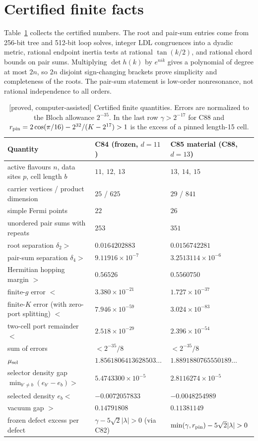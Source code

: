 \documentclass[11pt]{article}
\newcommand{\tg}[1]{\textsf{[#1]}}
\begin{document}
\section{Certified finite facts}\label{sec:facts}

Table~\ref{tab:cert} collects the certified numbers. The root and pair-sum entries come from 256-bit tree and 512-bit loop solves, integer LDL congruences into a dyadic metric, rational endpoint inertia tests at rational $\tan(k/2)$, and rational chord bounds on pair sums. Multiplying $\det h(k)$ by $e^{nik}$ gives a polynomial of degree at most $2n$, so $2n$ disjoint sign-changing brackets prove simplicity and completeness of the roots. The pair-sum statement is low-order nonresonance, not rational independence to all orders.

\begin{table}[h]
\centering
\footnotesize
\begin{tabular}{lll}
\toprule
Quantity & C84 (frozen, $d=11$) & C85 material (C88, $d=13$)\\
\midrule
active flavours $n$, data sites $p$, cell length $b$ & $11,\ 12,\ 13$ & $13,\ 14,\ 15$\\
carrier vertices / product dimension & $25$ / $625$ & $29$ / $841$\\
simple Fermi points & $22$ & $26$\\
unordered pair sums with repeats & $253$ & $351$\\
root separation $\delta_2>$ & $0.0164202883$ & $0.0156742281$\\
pair-sum separation $\delta_4>$ & $9.11916\times10^{-7}$ & $3.2513114\times10^{-6}$\\
Hermitian hopping margin $>$ & $0.56526$ & $0.5560750$\\
finite-$g$ error $<$ & $3.380\times10^{-21}$ & $1.727\times10^{-37}$\\
finite-$K$ error (with zero-port splitting) $<$ & $7.946\times10^{-59}$ & $3.024\times10^{-83}$\\
two-cell port remainder $<$ & $2.518\times10^{-29}$ & $2.396\times10^{-54}$\\
sum of errors & $<2^{-35}/8$ & $<2^{-35}/8$\\
$\mu_{\rm sel}$ & $1.8561806413628503\ldots$ & $1.8891880765550189\ldots$\\
selector density gap $\min_{b'\ne b}(e_{b'}-e_b)>$ & $5.4743300\times10^{-5}$ & $2.8116274\times10^{-5}$\\
selected density $e_b<$ & $-0.0072057833$ & $-0.0048254989$\\
vacuum gap $>$ & $0.14791808$ & $0.11381149$\\
frozen defect excess per defect & $\gamma-5\sqrt2|\lambda|>0$ (via C82) & $\min(\gamma,r_{\rm pin})-5\sqrt2|\lambda|>0$\\
\bottomrule
\end{tabular}
\caption{\tg{proved, computer-assisted} Certified finite quantities. Errors are normalized to the Bloch allowance $2^{-35}$. In the last row $\gamma>2^{-17}$ for C88 and $r_{\rm pin}=2\cos(\pi/16)-2^{32}/(K-2^{17})>1$ is the excess of a pinned length-15 cell.}\label{tab:cert}
\end{table}
\end{document}
